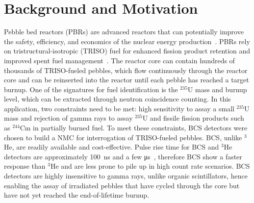 \documentclass[preprint,final]{elsarticle}
\begin{document}

\section{Background and Motivation}
Pebble bed reactors (PBRs) are advanced reactors that can potentially improve the safety, efficiency, and economics of the nuclear energy production~\cite{kadak2005future}. PBRs rely on tristructural-isotropic (TRISO) fuel for enhanced fission product retention and improved spent fuel management~\cite{demkowicz2019coated}. The reactor core can contain hundreds of thousands of TRISO-fueled pebbles, which flow continuously through the reactor core and can be reinserted into the reactor until each pebble has reached a target burnup.  One of the signatures for fuel identification is the ${}^{235}$U mass and burnup level, which can be extracted through neutron coincidence counting. In this application, two constraints need to be met: high sensitivity to assay a small ${}^{235}$U mass and rejection of gamma rays to assay ${}^{235}$U and fissile fission products such as ${}^{244}$Cm in partially burned fuel. To meet these constraints, BCS detectors were chosen to build a NMC for interrogation of TRISO-fueled pebbles. BCS, unlike ${}^{3}$He, are readily available and cost-effective. Pulse rise time for BCS and ${}^{3}$He detectors are approximately \SI{100}{\nano\second} and a few \si{\micro\second}~\cite{lacy2009boron}, therefore BCS show a faster response than ${}^{3}$He and are less prone to pile up in high count rate scenarios. BCS detectors are highly insensitive to gamma rays, unlike organic scintillators, hence enabling the assay of irradiated pebbles that have cycled through the core but have not yet reached the end-of-lifetime burnup.
\end{document}
